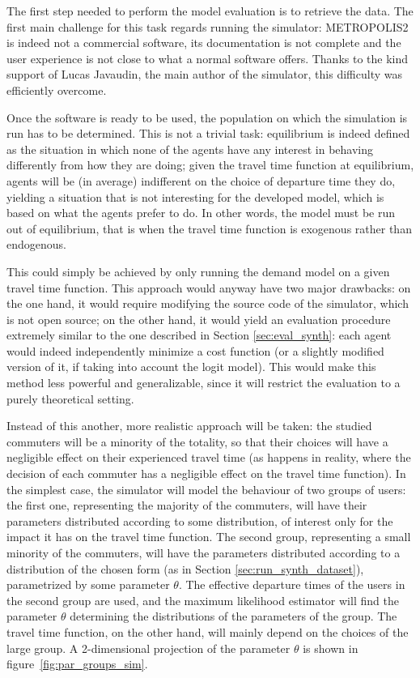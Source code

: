 The first step needed to perform the model evaluation is to retrieve the data.
The first main challenge for this task regards running the simulator:
METROPOLIS2 is indeed not a commercial software,
its documentation is not complete and the user experience is not close to what a normal software offers.
Thanks to the kind support of Lucas Javaudin,
the main author of the simulator, this difficulty was efficiently overcome.

Once the software is ready to be used,
the population on which the simulation is run has to be determined.
This is not a trivial task:
equilibrium is indeed defined as the situation in which none of the agents have any interest in behaving differently from how they are doing;
given the travel time function at equilibrium,
agents will be (in average) indifferent on the choice of departure time they do,
yielding a situation that is not interesting for the developed model,
which is based on what the agents prefer to do.
In other words, the model must be run out of equilibrium, that is when the travel time function is exogenous rather than endogenous.

This could simply be achieved by only running the demand model on a given travel time function.
This approach would anyway have two major drawbacks:
on the one hand, it would require modifying the source code of the simulator,
which is not open source;
on the other hand, it would yield an evaluation procedure extremely similar to the one described in Section \ref{sec:eval_synth}:
each agent would indeed independently minimize a cost function
(or a slightly modified version of it, if taking into account the logit model).
This would make this method less powerful and generalizable,
since it will restrict the evaluation to a purely theoretical setting.

Instead of this another, more realistic approach will be taken:
the studied commuters will be a minority of the totality,
so that their choices will have a negligible effect on their experienced travel time
(as happens in reality, where the decision of each commuter has a negligible effect on the travel time function).
In the simplest case, the simulator will model the behaviour of two groups of users:
the first one, representing the majority of the commuters,
will have their parameters distributed according to some distribution,
of interest only for the impact it has on the travel time function.
The second group, representing a small minority of the commuters,
will have the parameters distributed according to a distribution of the chosen form (as in Section \ref{sec:run_synth_dataset}),
parametrized by some parameter \(\theta\).
The effective departure times of the users in the second group are used,
and the maximum likelihood estimator will find the parameter \(\theta\) determining the distributions of the parameters of the group.
The travel time function, on the other hand,
will mainly depend on the choices of the large group.
A 2-dimensional projection of the parameter \(\theta\) is shown in figure~\ref{fig:par_groups_sim}.

